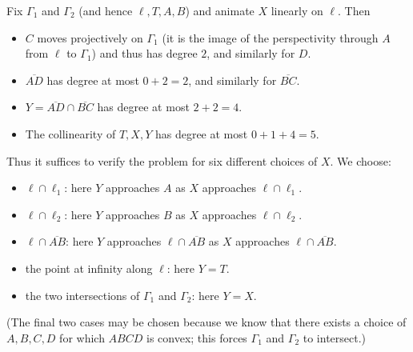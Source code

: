 \begin{solution}
    Fix $\Gamma_1$ and $\Gamma_2$ (and hence $\ell, T, A, B$) and animate $X$ linearly on $\ell$. Then

    \begin{itemize}
        \item $C$ moves projectively on $\Gamma_1$ (it is the image of the perspectivity through $A$ from $\ell$ to $\Gamma_1$) and thus has degree $2$, and similarly for $D$.
        \item $\overline{AD}$ has degree at most $0+2=2$, and similarly for $\overline{BC}$.
        \item $Y=\overline{AD}\cap\overline{BC}$ has degree at most $2+2=4.$
        \item The collinearity of $T,X,Y$ has degree at most $0+1+4=5.$
    \end{itemize}

    Thus it suffices to verify the problem for six different choices of $X$. We choose:

    \begin{itemize}
        \item $\ell\cap \ell_1$: here $Y$ approaches $A$ as $X$ approaches $\ell\cap \ell_1$.
        \item $\ell\cap\ell_2$: here $Y$ approaches $B$ as $X$ approaches $\ell\cap \ell_2$.
        \item $\ell\cap \overline{AB}$: here $Y$ approaches $\ell\cap \overline{AB}$ as $X$ approaches $\ell\cap \overline{AB}$.
        \item the point at infinity along $\ell$: here $Y=T$.
        \item the two intersections of $\Gamma_1$ and $\Gamma_2$: here $Y=X$.
    \end{itemize}

    (The final two cases may be chosen because we know that there exists a choice of $A,B,C,D$ for which $ABCD$ is convex; this forces $\Gamma_1$ and $\Gamma_2$ to intersect.)
\end{solution}



